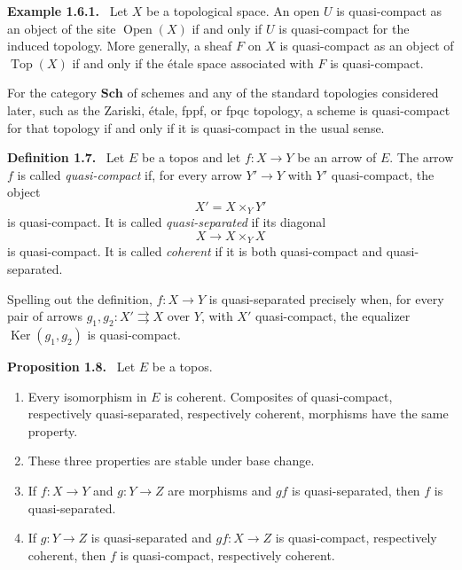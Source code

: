 \documentclass[11pt]{article}
\newcommand{\Sch}{\mathbf{Sch}}
\newcommand{\Top}{\operatorname{Top}}
\newcommand{\Ouv}{\operatorname{Open}}
\newcommand{\Ker}{\operatorname{Ker}}
\newcommand{\fprod}[3]{{#1}\times_{#3}{#2}}
\newenvironment{statement}[1]{\par\medskip\noindent\textbf{#1.}\ }{\par\medskip}
\newenvironment{remarktext}[1]{\par\medskip\noindent\textbf{#1.}\ }{\par\medskip}
\begin{document}
\begin{remarktext}{Example 1.6.1}
Let \(X\) be a topological space. An open \(U\) is quasi-compact as an object of the site \(\Ouv(X)\) if and only if \(U\) is quasi-compact for the induced topology. More generally, a sheaf \(F\) on \(X\) is quasi-compact as an object of \(\Top(X)\) if and only if the \'etale space associated with \(F\) is quasi-compact.
\end{remarktext}

For the category \(\Sch\) of schemes and any of the standard topologies considered later, such as the Zariski, \'etale, fppf, or fpqc topology, a scheme is quasi-compact for that topology if and only if it is quasi-compact in the usual sense.

\begin{statement}{Definition 1.7}
Let \(E\) be a topos and let \(f:X\to Y\) be an arrow of \(E\). The arrow \(f\) is called \emph{quasi-compact} if, for every arrow \(Y'\to Y\) with \(Y'\) quasi-compact, the object
\[
X'=\fprod{X}{Y'}{Y}
\]
is quasi-compact. It is called \emph{quasi-separated} if its diagonal
\[
X\longrightarrow \fprod{X}{X}{Y}
\]
is quasi-compact. It is called \emph{coherent} if it is both quasi-compact and quasi-separated.
\end{statement}

Spelling out the definition, \(f:X\to Y\) is quasi-separated precisely when, for every pair of arrows \(g_1,g_2:X'\rightrightarrows X\) over \(Y\), with \(X'\) quasi-compact, the equalizer \(\Ker(g_1,g_2)\) is quasi-compact.

\begin{statement}{Proposition 1.8}
Let \(E\) be a topos.
\begin{enumerate}[label=(\roman*)]
\item Every isomorphism in \(E\) is coherent. Composites of quasi-compact, respectively quasi-separated, respectively coherent, morphisms have the same property.
\item These three properties are stable under base change.
\item If \(f:X\to Y\) and \(g:Y\to Z\) are morphisms and \(gf\) is quasi-separated, then \(f\) is quasi-separated.
\item If \(g:Y\to Z\) is quasi-separated and \(gf:X\to Z\) is quasi-compact, respectively coherent, then \(f\) is quasi-compact, respectively coherent.
\end{enumerate}
\end{statement}
\end{document}
